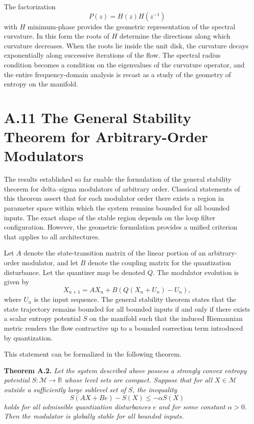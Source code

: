 The factorization
\[
P(z) = H(z) H(z^{-1})
\]
with \(H\) minimum-phase provides the geometric representation of the spectral curvature. In this form the roots of \(H\) determine the directions along which curvature decreases. When the roots lie inside the unit disk, the curvature decays exponentially along successive iterations of the flow. The spectral radius condition becomes a condition on the eigenvalues of the curvature operator, and the entire frequency-domain analysis is recast as a study of the geometry of entropy on the manifold.

\section{A.11 The General Stability Theorem for Arbitrary-Order Modulators}

The results established so far enable the formulation of the general stability theorem for delta–sigma modulators of arbitrary order. Classical statements of this theorem assert that for each modulator order there exists a region in parameter space within which the system remains bounded for all bounded inputs. The exact shape of the stable region depends on the loop filter configuration. However, the geometric formulation provides a unified criterion that applies to all architectures.

Let \(A\) denote the state-transition matrix of the linear portion of an arbitrary-order modulator, and let \(B\) denote the coupling matrix for the quantization disturbance. Let the quantizer map be denoted \(Q\). The modulator evolution is given by
\[
X_{n+1} = A X_n + B(Q(X_n + U_n) - U_n),
\]
where \(U_n\) is the input sequence. The general stability theorem states that the state trajectory remains bounded for all bounded inputs if and only if there exists a scalar entropy potential \(S\) on the manifold such that the induced Riemannian metric renders the flow contractive up to a bounded correction term introduced by quantization.

This statement can be formalized in the following theorem.

\medskip

\textbf{Theorem A.2.}
\emph{Let the system described above possess a strongly convex entropy potential \(S:\mathcal{M}\to\mathbb{R}\) whose level sets are compact. Suppose that for all \(X\in\mathcal{M}\) outside a sufficiently large sublevel set of \(S\), the inequality}
\[
S(A X + B e) - S(X) \leq -\alpha S(X)
\]
\emph{holds for all admissible quantization disturbances \(e\) and for some constant \(\alpha>0\). Then the modulator is globally stable for all bounded inputs.}

